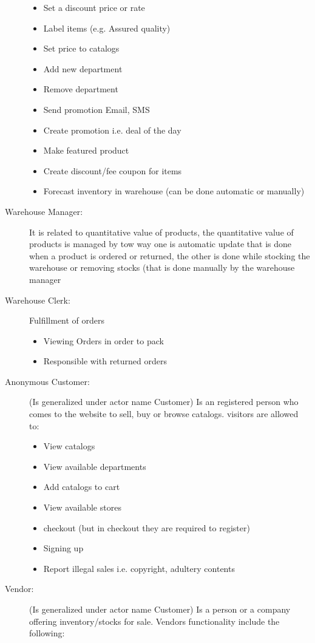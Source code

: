 \begin{description}
\begin{itemize}
		\item Set a discount price or rate
		\item Label items (e.g. Assured quality)
		\item Set price to catalogs
		\item Add new department
		\item Remove department
		\item Send promotion Email, SMS
		\item Create promotion i.e. deal of the day 
		\item Make featured product
		\item Create discount/fee coupon for items
		\item Forecast inventory in warehouse (can be done automatic or manually)
	\end{itemize}
	\item[Warehouse Manager:] It is related to quantitative value of products, the quantitative value of products is managed by tow way one is automatic update that is done when a product is ordered or returned, the other is done while stocking the warehouse or removing stocks (that is done manually by the warehouse manager     
	\item[Warehouse Clerk:] Fulfillment of orders  	
	\begin{itemize}
		\item Viewing Orders in order to pack
		\item Responsible with returned orders
	\end{itemize}
	\item[Anonymous Customer:] (Is generalized under actor name Customer) Is an registered person who comes to the website to sell, buy or browse catalogs. visitors are allowed to:
	\begin{itemize}
		\item View catalogs
		\item View available departments
		\item Add catalogs to cart
		\item View available stores
		\item checkout (but in checkout they are required to register)
		\item Signing up
		\item Report illegal sales i.e. copyright, adultery contents
	\end{itemize}
	\item[Vendor:] (Is generalized under actor name Customer) Is a person or a company offering inventory/stocks for sale. Vendors functionality include the following:

\end{description}
